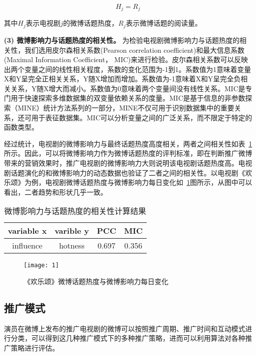 \begin{equation}H_j = R_j\end{equation}

其中$H_j$表示电视剧$j$的微博话题热度，$R_j$表示微博话题的阅读量。

\textbf{(3) 微博影响力与话题热度的相关性。}
为检验电视剧微博影响力与话题热度的相关性，我们选用皮尔森相关系数(Pearson correlation coefficient)和最大信息系数(Maximal Information Coefficient， MIC)来进行检验。皮尔森相关系数可以反映出两个变量之间的线性相关程度，系数的变化范围为-1到1。系数值为1意味着变量X和Y呈完全正相关关系，Y随X增加而增加。系数值为-1意味着X和Y呈完全负相关关系，Y随X增大而减小。系数值为0意味着两个变量间没有线性关系。MIC是专门用于快速探索多维数据集的双变量依赖关系的度量。MIC是基于信息的非参数探索（MINE）统计方法系列的一部分，MINE不仅可用于识别数据集中的重要关系，还可用于表征数据集。MIC可以分析变量之间的广泛关系，而不限定于特定的函数类型\cite{10}。

经过统计，电视剧的微博影响力与最终话题热度高度相关，两者之间相关性如表~\ref{rel}所示。因此，可以将微博影响力作为微博话题热度的评判标准，即在判断推广微博带来的营销效果时，推广电视剧的微博影响力大则说明该电视剧话题热度高。电视剧话题演化的和微博影响力的动态数据也验证了二者之间的相关性。以电视剧《欢乐颂》为例，电视剧微博话题热度与微博影响力每日变化如~\ref{huanl}图所示，从图中可以看出，二者趋势和形状几乎一致。

\begin{table}[h]
\centering
\caption{微博影响力与话题热度的相关性计算结果}
\label{rel}
\begin{tabular}{|c|c|c|c|} \hline
variable x&varible y&PCC&MIC\\ \hline
influence&hotness&0.697&0.356\\
\hline\end{tabular}
\end{table}

\begin{figure}[!htbp]
\centering
\texttt{[image: 1]}
\caption{《欢乐颂》微博话题热度与微博影响力每日变化}
\label{huanl}
\end{figure}

\subsection{推广模式}

演员在微博上发布的推广电视剧的微博可以按照推广周期、推广时间和互动模式进行分类，可以得到这几种推广模式下的多种推广策略，进而可以利用算法对各种推广策略进行评估。

